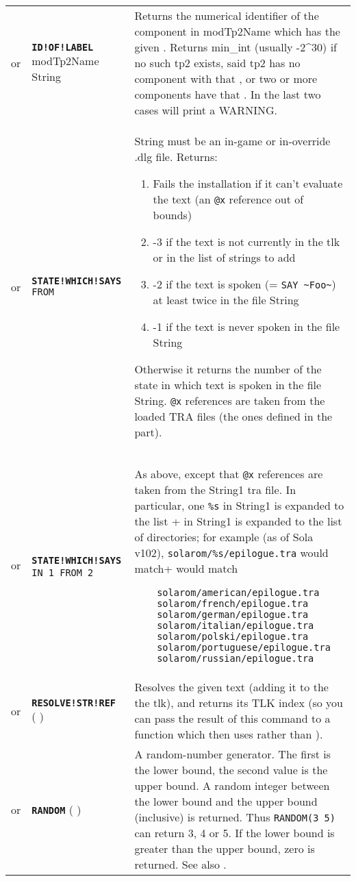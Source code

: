 \documentclass{article}
\def\ttref#1{\ahrefloc{#1}{\tt #1}}
\def\DEFINE#1{{\tt \bf #1}\label{#1}\index{#1}}
\def\DEFSYN#1{{\tt \bf #1}\index{#1}}
\def\t#1{{\tt #1}}
\begin{document}
\begin{tabular}{cp{10in}|p{10in}}
or & \DEFINE{ID!OF!LABEL} modTp2Name String &
  Returns the numerical identifier of the component in modTp2Name which has
  the given \ttref{LABEL}. Returns min_int (usually -2^30) if no such tp2
  exists, said tp2 has no component with that \ttref{LABEL}, or two or more
  components have that \ttref{LABEL}. In the last two cases will print a
  WARNING. \\

or & \DEFINE{STATE!WHICH!SAYS} \ttref{text} \t{FROM} \ttref{String} &
  String must be an in-game or in-override .dlg file. Returns:
  \begin{enumerate}
  \item Fails the installation if it can't evaluate the text (an \t{@x} reference out of bounds)
  \item -3 if the text is not currently in the tlk or in the list of strings to add
  \item -2 if the text is spoken (= \verb+SAY ~Foo~+) at least twice in the file String
  \item -1 if the text is never spoken in the file String
  \end{enumerate}
  Otherwise it returns the number of the state in which text is spoken in the file String.
  \t{@x} references are taken from the loaded TRA files (the ones defined in the 
  \ttref{Language} part).
\\

or & \DEFSYN{STATE!WHICH!SAYS} \t{\ttref{value} IN \ttref{String}1 FROM \ttref{String}2} &
  As above, except that \t{@x} references are taken from
    the String1 tra file. In particular, one \verb+%s+ in String1 is expanded to the list 
    of directories; for example (as of Sola v102), \verb+solarom/%s/epilogue.tra+ would match
\begin{verbatim}
    solarom/american/epilogue.tra
    solarom/french/epilogue.tra
    solarom/german/epilogue.tra
    solarom/italian/epilogue.tra
    solarom/polski/epilogue.tra
    solarom/portuguese/epilogue.tra
    solarom/russian/epilogue.tra
\end{verbatim}
\\
or & \DEFINE{RESOLVE!STR!REF} ( \ttref{text} ) &
Resolves the given text (adding it to the the tlk), and returns its TLK index
(so you can pass the result of this command to a function which then uses
\ttref{WRITE!LONG} rather than \ttref{SAY}).
\\
or & \DEFINE{RANDOM} ( \ttref{value} \ttref{value} ) &
A random-number generator. The first \ttref{value} is the lower bound, the
second value is the upper bound. A random integer between the lower bound
and the upper bound (inclusive) is returned. Thus \t{RANDOM(3 5)} can
return 3, 4 or 5. If the lower bound is greater than the upper bound, zero
is returned. See also \ttref{RANDOM!SEED}. \\


\end{tabular}
\end{document}
